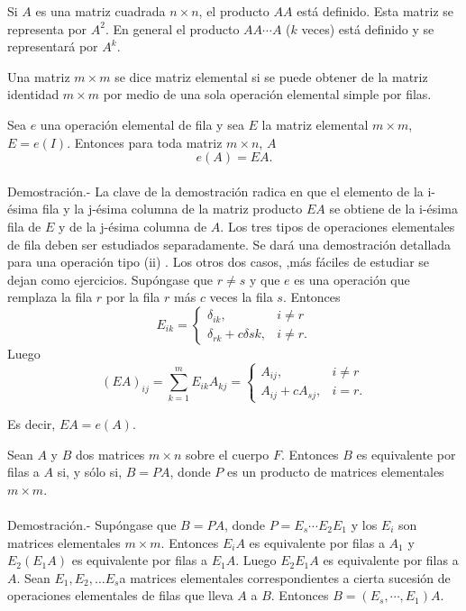 Si $A$ es una matriz cuadrada $n\times n$, el producto $AA$ está definido. Esta matriz se representa por $A^2$. En general el producto $AA\cdots A$ ($k$ veces) está definido y se representará por $A^k$.

    \begin{def.}
	Una matriz $m\times m$ se dice matriz elemental si se puede obtener de la matriz identidad $m\times m$ por medio de una sola operación elemental simple por filas.
    \end{def.}

\begin{teo}
    Sea $e$ una operación elemental de fila y sea $E$ la matriz elemental $m\times m$, $E=e(I)$. Entonces para toda matriz $m\times n$, $A$
    $$e(A)=EA.$$\\
	Demostración.-\; La clave de la demostración radica en que el elemento de la i-ésima fila y la j-ésima columna de la matriz producto $EA$ se obtiene de la i-ésima fila de $E$ y de la j-ésima columna de $A$. Los tres tipos de operaciones elementales de fila deben ser estudiados separadamente. Se dará una demostración detallada para una operación tipo (ii) . Los otros dos casos, ,más fáciles de estudiar se dejan como ejercicios. Supóngase que $r\neq s$ y que $e$ es una operación que remplaza la fila $r$ por la fila $r$ más $c$ veces la fila $s$. Entonces
	$$E_{ik}=\left\{\begin{array}{ll}
		\delta_{ik}, & i\neq r\\
		\delta_{rk} + c\delta sk, & i\neq r.
    \end{array}\right.$$
    Luego
    $$ (EA)_{ij}=\sum_{k=1}^m E_{ik}A_{kj} = \left\{\begin{array}{ll}
	    		A_{ij}, & i\neq r\\
			A_{ij} + cA_{sj}, & i=r.
    \end{array}\right.$$

    Es decir, $EA=e(A).$\\

\end{teo}

\begin{cor}
    Sean $A$ y $B$ dos matrices $m\times n$ sobre el cuerpo $F$. Entonces $B$ es equivalente por filas a $A$ si, y sólo si, $B=PA$, donde $P$ es un producto de matrices elementales $m\times m$.\\\\
	Demostración.-\; Supóngase que $B=PA$, donde $P=E_s\cdots E_2E_1$ y los $E_i$ son matrices elementales $m\times m$. Entonces $E_iA$ es equivalente por filas a $A_1$ y $E_2(E_1A)$ es equivalente por filas a $E_1A$. Luego $E_2E_1A$ es equivalente por filas a $A$. Sean $E_1,E_2,\ldots E_s$a matrices elementales correspondientes a cierta sucesión de operaciones elementales de filas que lleva $A$ a $B$. Entonces $B=(E_s,\cdots , E_1)A.$
\end{cor}


